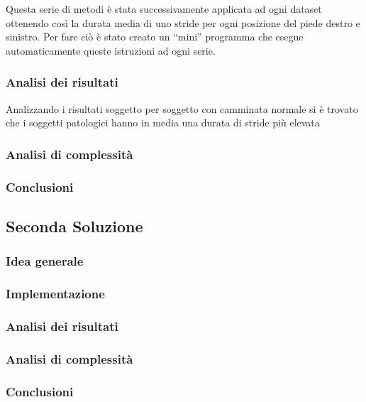 Questa serie di metodi è stata successivamente applicata ad ogni dataset ottenendo così la durata
media di uno stride per ogni posizione del piede destro e sinistro. Per fare ciò è stato creato
un ``mini'' programma che esegue automaticamente queste istruzioni ad ogni serie.

\subsubsection{Analisi dei risultati}
Analizzando i risultati soggetto per soggetto con camminata normale si è trovato che
i soggetti patologici hanno in media una durata di stride più elevata

\subsubsection{Analisi di complessità}
\subsubsection{Conclusioni}



\subsection{Seconda Soluzione}

\subsubsection{Idea generale}
\subsubsection{Implementazione}
\subsubsection{Analisi dei risultati}
\subsubsection{Analisi di complessità}
\subsubsection{Conclusioni}